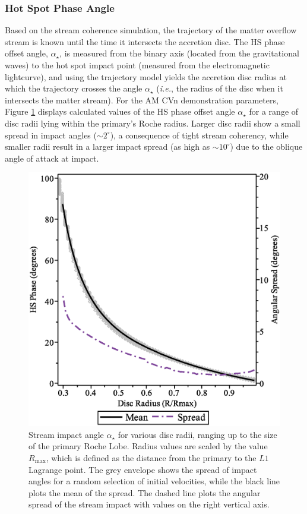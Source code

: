 \documentclass[preprint2]{aastex}
\begin{document}
\subsubsection{Hot Spot Phase Angle}
Based on the stream coherence simulation, the trajectory of the matter
overflow stream is known until the time it intersects the accretion
disc.  The HS phase offset angle, $\alpha_\star$, is measured from the binary
axis (located from the gravitational waves) to the hot spot impact
point (measured from the electromagnetic lightcurve), and using the
trajectory model yields the accretion disc radius at which the
trajectory crosses the angle $\alpha_\star$ ({\it i.e.}, the radius of the
disc when it intersects the matter stream).  For the AM CVn
demonstration parameters, Figure \ref{fig.impact_angle} displays
calculated values of the HS phase offset angle $\alpha_\star$ for a range of
disc radii lying within the primary's Roche radius.  Larger disc radii
show a small spread in impact angles ($\sim 2^{\circ}$), a consequence
of tight stream coherency, while smaller radii result in a larger
impact spread (as high as $\sim 10^{\circ}$) due to the oblique angle
of attack at impact.

\begin{figure}[h]
  \includegraphics[width=\columnwidth]{./impact_angle_0.06.eps}
  \caption{Stream impact angle $\alpha_\star$ for various disc radii,
  ranging up to the size of the primary Roche Lobe.  Radius values are
  scaled by the value $R_\text{max}$, which is defined as the distance
  from the primary to the $L1$ Lagrange point.  The grey envelope
  shows the spread of impact angles for a random selection of initial
  velocities, while the black line plots the mean of the spread.  The
  dashed line plots the angular spread of the stream impact with
  values on the right vertical axis.}
  \label{fig.impact_angle}
\end{figure}
\end{document}
